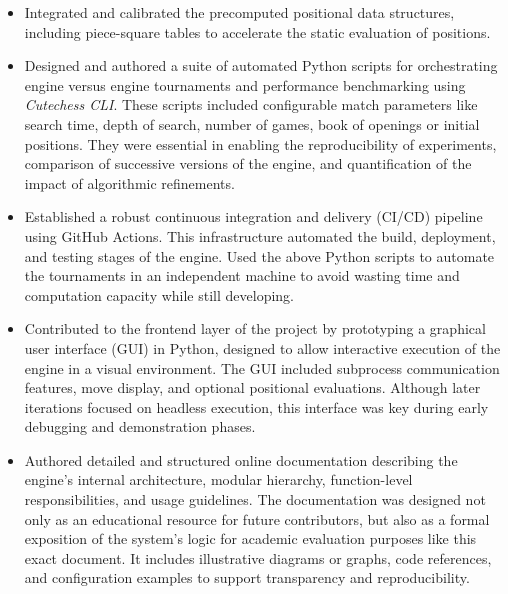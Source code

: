 \begin{itemize}
    \item Integrated and calibrated the precomputed positional data structures, including piece-square tables to accelerate the static evaluation of positions.

    \item Designed and authored a suite of automated Python scripts for orchestrating engine versus engine tournaments and performance benchmarking using \textit{Cutechess CLI}. These scripts included configurable match parameters like search time, depth of search, number of games, book of openings or initial positions. They were essential in enabling the reproducibility of experiments, comparison of successive versions of the engine, and quantification of the impact of algorithmic refinements.

    \item Established a robust continuous integration and delivery (CI/CD) pipeline using GitHub Actions. This infrastructure automated the build, deployment, and testing stages of the engine. Used the above Python scripts to automate the tournaments in an independent machine to avoid wasting time and computation capacity while still developing.

    \item Contributed to the frontend layer of the project by prototyping a graphical user interface (GUI) in Python, designed to allow interactive execution of the engine in a visual environment. The GUI included subprocess communication features, move display, and optional positional evaluations. Although later iterations focused on headless execution, this interface was key during early debugging and demonstration phases.

    \item Authored detailed and structured online documentation describing the engine's internal architecture, modular hierarchy, function-level responsibilities, and usage guidelines. The documentation was designed not only as an educational resource for future contributors, but also as a formal exposition of the system's logic for academic evaluation purposes like this exact document. It includes illustrative diagrams or graphs, code references, and configuration examples to support transparency and reproducibility.
\end{itemize}
